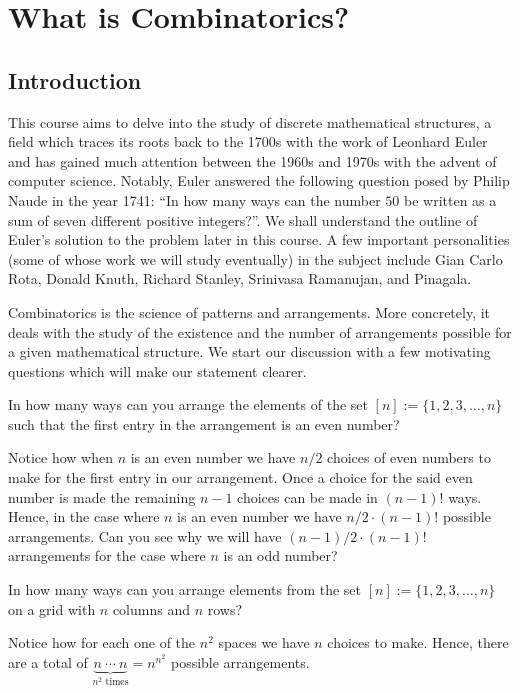 \chapter{What is Combinatorics?}
\section{Introduction}
This course aims to delve into the study of discrete mathematical structures, a field which traces its roots back to the 1700s with the work of Leonhard Euler and has gained much attention between the 1960s and 1970s with the advent of computer science. Notably, Euler answered the following question posed by Philip Naude in the year 1741: “In how many ways can the number $50$ be written as a sum of seven different positive integers?”. We shall understand the outline of Euler’s solution to the problem later in this course. A few important personalities (some of whose work we will study eventually) in the subject include Gian Carlo Rota, Donald Knuth, Richard Stanley, Srinivasa Ramanujan, and Pinagala. 

Combinatorics is the science of patterns and arrangements. More concretely, it deals with the study of the existence and the number of arrangements possible for a given mathematical structure. We start our discussion with a few motivating questions which will make our statement clearer.

\begin{question}
	In how many ways can you arrange the elements of the set $[n]:=\{1,2,3,\ldots,n\}$ such that the first entry in the arrangement is an even number?
\end{question}

Notice how when $n$ is an even number we have $n/2$ choices of even numbers to make for the first entry in our arrangement. Once a choice for the said even number is made the remaining $n-1$ choices can be made in $\left( n-1 \right)!$ ways. Hence, in the case where $n$ is an even number we have $n/2 \cdot \left(n-1 \right)!$ possible arrangements. Can you see why we will have $\left( n-1 \right)/2 \cdot \left( n-1 \right)!$ arrangements for the case where $n$ is an odd number?

\begin{question}
    In how many ways can you arrange elements from the set $[n]:=\{1,2,3,\ldots,n\}$ on a grid with $n$ columns and $n$ rows?
\end{question}

Notice how for each one of the $n^2$ spaces we have $n$ choices to make. Hence, there are a total of $\underbrace{n \ \cdots \ n}_{n^2 \text{ times}} = n^{n^2}$ possible arrangements.


